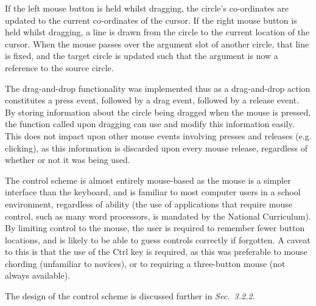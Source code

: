 \documentclass[12pt,twoside,notitlepage,xetex]{report}
\begin{document}
If the left mouse button is held whilst dragging, the circle's co-ordinates are updated to the current co-ordinates of the cursor.  If the right mouse button is held whilst dragging, a line is drawn from the circle to the current location of the cursor.  When the mouse passes over the argument slot of another circle, that line is fixed, and the target circle is updated such that the argument is now a reference to the source circle.

The drag-and-drop functionality was implemented thus as a drag-and-drop action constitutes a press event, followed by a drag event, followed by a release event.  By storing information about the circle being dragged when the mouse is pressed, the function called upon dragging can use and modify this information easily.  This does not impact upon other mouse events involving presses and releases (e.g. clicking), as this information is discarded upon every mouse release, regardless of whether or not it was being used.

The control scheme is almost entirely mouse-based as the mouse is a simpler interface than the keyboard, and is familiar to most computer users in a school environment, regardless of ability (the use of applications that require mouse control, such as many word processors, is mandated by the National Curriculum).  By limiting control to the mouse, the user is required to remember fewer button locations, and is likely to be able to guess controls correctly if forgotten.  A caveat to this is that the use of the Ctrl key is required, as this was preferable to mouse chording (unfamiliar to novices), or to requiring a three-button mouse (not always available).

The design of the control scheme is discussed further in \emph{Sec.~3.2.2}. %

%
%
\end{document}
